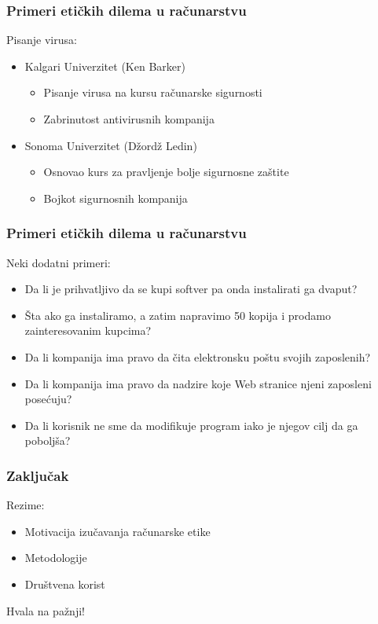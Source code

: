 \documentclass[pdf]{beamer}
\begin{document}
\begin{frame}
\frametitle{Primeri etičkih dilema u računarstvu}
		Pisanje virusa:
		\begin{itemize}
		\item Kalgari Univerzitet (Ken Barker)
			\begin{itemize}
			\item Pisanje virusa na kursu računarske sigurnosti
			\item Zabrinutost antivirusnih kompanija 
			\end{itemize}
		
		\item Sonoma Univerzitet (Džordž Ledin)
			\begin{itemize}
			\item Osnovao kurs za pravljenje bolje sigurnosne zaštite
			\item Bojkot sigurnosnih kompanija
			\end{itemize}
		\end{itemize}
\end{frame}


\begin{frame}
\frametitle{Primeri etičkih dilema u računarstvu}
	Neki dodatni primeri:
	\begin{itemize}
	\item Da li je prihvatljivo da se kupi softver pa onda instalirati ga dvaput?
	\item Šta ako ga instaliramo, a zatim napravimo 50 kopija i prodamo zainteresovanim kupcima?
	\item Da li kompanija ima pravo da čita elektronsku poštu svojih zaposlenih?
	\item Da li kompanija ima pravo da nadzire koje Web stranice njeni zaposleni posećuju?
	\item Da li korisnik ne sme da modifikuje program iako je njegov cilj da ga poboljša?
	\end{itemize}
\end{frame}

\begin{frame}
\frametitle{Zaključak} %


	Rezime:

	\begin{itemize}	
	\item Motivacija izučavanja računarske etike	
	\item Metodologije %
	\item Društvena korist %
	\end{itemize}

Hvala na pažnji!

\end{frame}
\end{document}

